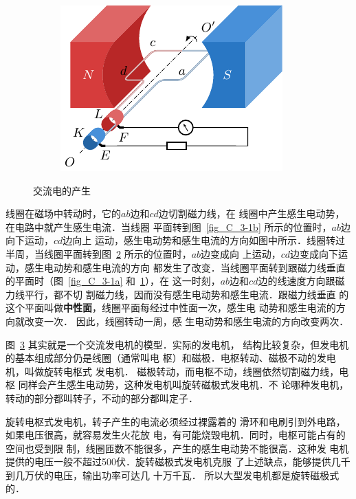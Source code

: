 \begin{figure}[htbp]
\begin{subfigure}{0.4\linewidth}
        \caption{}\label{fig_C_3-1c}
    \end{subfigure}
    \hfil
    \begin{subfigure}{0.4\linewidth}
        \centering
        \includegraphics{fig/C/3-1d.pdf}
        \caption{}\label{fig_C_3-1d}
    \end{subfigure}
    \caption{交流电的产生}\label{fig_C_3-1}
\end{figure}

线圈在磁场中转动时，它的$ab$边和$cd$边切割磁力线，在
线圈中产生感生电动势，在电路中就产生感生电流．当线圈
平面转到图~\ref{fig_C_3-1b} 所示的位置时，$ab$边向下运动，$cd$边向上
运动，感生电动势和感生电流的方向如图中所示．线圈转过
半周，当线圈平面转到图~\ref{fig_C_3-1d} 所示的位置时，$ab$边变成向
上运动，$cd$边变成向下运动，感生电动势和感生电流的方向
都发生了改变．当线圈平面转到跟磁力线垂直的平面时（图~\ref{fig_C_3-1a} 和~\ref{fig_C_3-1c}），在
这一时刻，$ab$边和$cd$边的线速度方向跟磁力线平行，都不切
割磁力线，因而没有感生电动势和感生电流．跟磁力线垂直
的这个平面叫做\textbf{中性面}，线圈平面每经过中性面一次，感生电
动势和感生电流的方向就改变一次．
因此，线圈转动一周，感
生电动势和感生电流的方向改变两次．

图~\ref{fig_C_3-1} 其实就是一个交流发电机的模型．实际的发电机，
结构比较复杂，但发电机的基本组成部分仍是线圈（通常叫电
枢）和磁极．电枢转动、磁极不动的发电机，叫做旋转电枢式
发电机．
磁极转动，而电枢不动，线圈依然切割磁力线，电枢
同样会产生感生电动势，这种发电机叫旋转磁极式发电机．不
论哪种发电机，转动的部分都叫转子，不动的部分都叫定子．

旋转电枢式发电机，转子产生的电流必须经过裸露着的
滑环和电刷引到外电路，如果电压很高，就容易发生火花放
电，有可能烧毁电机．同时，电枢可能占有的空间也受到限
制，线圈匝数不能很多，产生的感生电动势不能很高．这种发
电机提供的电压一般不超过500伏．旋转磁极式发电机克服
了上述缺点，能够提供几千到几万伏的电压，输出功率可达几
十万千瓦．
所以大型发电机都是旋转磁极式的．

